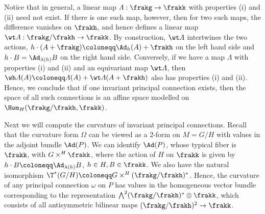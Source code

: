 \begin{rem}
    Notice that in general, a linear map $\varLambda:\frakg\to \frakk$ with properties (i) and (ii) need not exist. If there is one such map, however, then for two such maps, the difference vanishes on $\frakh$, and hence defines a linear map $\wt\varLambda:\frakg\slash\frakh\to \frakk$. By construction, $\wt\varLambda$ intertwines the two actions, $h\cdot (A+\frakg)\coloneqq \Ad_h(A)+\frakh$ on the left hand side and $h\cdot B=\Ad_{\lambda(h)}B$ on the right hand side. Conversely, if we have a map $\varLambda$ with properties (i) and (ii) and an equivariant map $\wt\varLambda$, then $\wh\varLambda(A)\coloneqq \varLambda(A)+\wt\varLambda(A+\frakh)$ also has properties (i) and (ii). Hence, we conclude that if one invariant principal connection exists, then the space of all such connections is an affine space modelled on $\Hom_H(\frakg\slash\frakh,\frakk)$.
\end{rem}

Next we will compute the curvature of invariant principal connections. Recall that the curvature form $\Omega$ can be viewed as a $2$-form on $M=G\slash H$ with values in the adjoint bundle $\Ad(P)$.  We can identify $\Ad(P)$, whose typical fiber is $\frakk$, with $G\times^H \frakk$, where the action of $H$ on $\frakk$ is given by $h\cdot B\coloneqq \Ad_{\lambda(h)}B$, $h\in H, B\in\frakk$. We also have the natural isomorphism $\T^\ast(G\slash H)\coloneqq G\times^H (\frakg\slash\frakh)^\ast$. Hence, the curvature of any principal connection $\omega$ on $P$ has values in the homogeneous vector bundle corresponding to the representation $\bigwedge^2(\frakg\slash\frakh)^\ast\otimes\frakk$, which consists of all antisymmetric bilinear maps $(\frakg\slash\frakh)^2\to\frakk$. 

